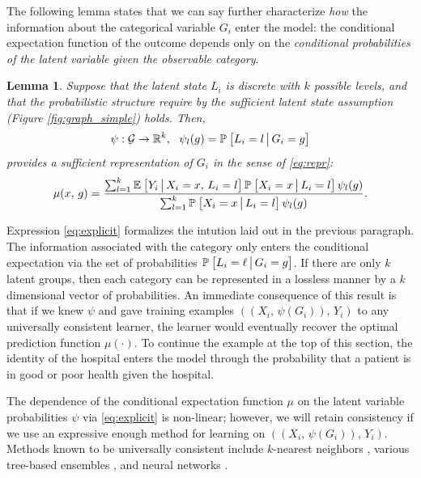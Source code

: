 \documentclass{article}
\theoremstyle{plain}
\newtheorem{lemm}[prop]{Lemma}
\theoremstyle{definition}
\theoremstyle{remark}
\begin{document}
The following lemma states that we can say further characterize \emph{how} the information about the categorical variable $G_{i}$ enter the model: the conditional expectation function of the outcome depends only on the \emph{conditional probabilities of the latent variable given the observable category}.

\begin{lemm}
\label{lemm:repr}
Suppose that the latent state $L_i$ is discrete with $k$ possible levels, and that the probabilistic structure require by the sufficient latent state assumption (Figure \ref{fig:graph_simple}) holds. Then,
\begin{equation}
\label{eq:psi}
\psi: \mathcal{G} \rightarrow \mathbb{R}^k, \ \ \psi_l(g) = \mathbb{P}_{}\left[L_i = l \,\big|\, G_i = g\right]
\end{equation}
provides a sufficient representation of $G_i$ in the sense of \eqref{eq:repr}:
\begin{equation}
\label{eq:explicit}
\mu(x, \, g) = \frac{\sum_{l = 1}^k  \mathbb{E}_{}\left[Y_i \,\big|\, X_i = x, \, L_i = l\right] \mathbb{P}_{}\left[X_i = x \,\big|\, L_i = l\right] \psi_l(g)}{\sum_{l = 1}^k \mathbb{P}_{}\left[X_i = x \,\big|\, L_i = l\right] \psi_l(g)}.
\end{equation}
\end{lemm}

Expression \eqref{eq:explicit} formalizes the intution laid out in the previous paragraph. The information associated with the category only enters the conditional expectation via the set of probabilities $\mathbb{P}_{}\left[L_{i} = \ell \,\big|\, G_{i} = g\right]$. If there are only $k$ latent groups, then each category can be represented in a lossless manner by a $k$ dimensional vector of probabilities. An immediate consequence of this result is that if we knew $\psi$ and gave training examples $((X_i, \, \psi(G_i)), \, Y_i)$ to any universally consistent learner, the learner would eventually recover the optimal prediction function $\mu(\cdot)$. To continue the example at the top of this section, the identity of the hospital enters the model through the probability that a patient is in good or poor health given the hospital.

The dependence of the conditional expectation function $\mu$ on the latent variable probabilities $\psi$ via \eqref{eq:explicit} is non-linear; however, we will retain consistency if we use an expressive enough method for learning on $((X_i, \, \psi(G_i)), \, Y_i)$. Methods known to be universally consistent include $k$-nearest neighbors \citep{stone1977consistent}, various tree-based ensembles \citep{biau2008consistency}, and neural networks \citep{farago1993strong}.
\end{document}
